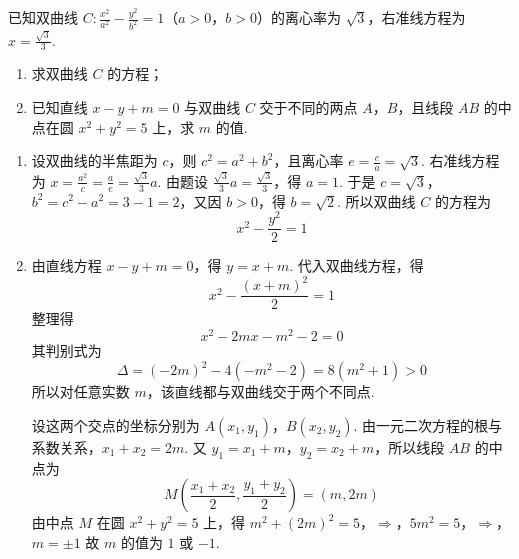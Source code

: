\begin{problem}
已知双曲线 \(C: \frac{x^2}{a^2} - \frac{y^2}{b^2} = 1\)（\(a > 0\)，\(b > 0\)）的离心率为 \(\sqrt{3}\)，右准线方程为 \(x = \frac{\sqrt{3}}{3}\).
\begin{enumerate}
\item 求双曲线 \(C\) 的方程；
\item 已知直线 \(x - y + m = 0\) 与双曲线 \(C\) 交于不同的两点 \(A\)，\(B\)，且线段 \(AB\) 的中点在圆 \(x^{2} + y^{2} = 5\) 上，求 \(m\) 的值.
\end{enumerate}

\begin{solution}
\begin{enumerate}
\item 设双曲线的半焦距为 \(c\)，则 \(c^2=a^2+b^2\)，且离心率 \(e=\frac{c}{a}=\sqrt{3}\).
右准线方程为 \(x=\frac{a^2}{c}=\frac{a}{e}=\frac{\sqrt{3}}{3}a\).
由题设 \(\frac{\sqrt{3}}{3}a=\frac{\sqrt{3}}{3}\)，得 \(a=1\).
于是 \(c=\sqrt{3}\)，\(b^2=c^2-a^2=3-1=2\)，又因 \(b>0\)，得 \(b=\sqrt{2}\).
所以双曲线 \(C\) 的方程为
\[
x^2-\frac{y^2}{2}=1
\]

\item 由直线方程 \(x-y+m=0\)，得 \(y=x+m\).
代入双曲线方程，得
\[
x^2-\frac{(x+m)^2}{2}=1
\]
整理得
\[
x^2-2mx-m^2-2=0
\]
其判别式为
\[
\Delta=(-2m)^2-4(-m^2-2)=8(m^2+1)>0
\]
所以对任意实数 \(m\)，该直线都与双曲线交于两个不同点.

设这两个交点的坐标分别为 \(A(x_1,y_1)\)，\(B(x_2,y_2)\).
由一元二次方程的根与系数关系，\(x_1+x_2=2m\).
又 \(y_1=x_1+m\)，\(y_2=x_2+m\)，所以线段 \(AB\) 的中点为
\[
M\left(\frac{x_1+x_2}{2},\frac{y_1+y_2}{2}\right)=\left(m,2m\right)
\]
由中点 \(M\) 在圆 \(x^2+y^2=5\) 上，得
\(m^2+(2m)^2=5\)，\(\Longrightarrow\)，\(5m^2=5\)，\(\Longrightarrow\)，\(m=\pm1\)
故 \(m\) 的值为 \(1\) 或 \(-1\).
\end{enumerate}
\end{solution}
\end{problem}

